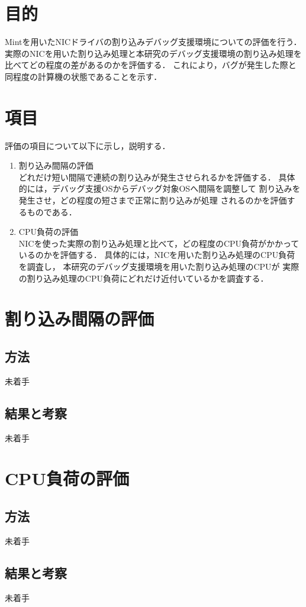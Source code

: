 \documentclass[tanilab-enum]{graduate}
\begin{document}
\section{目的}
Mintを用いたNICドライバの割り込みデバッグ支援環境についての評価を行う．
実際のNICを用いた割り込み処理と本研究のデバッグ支援環境の割り込み処理を
比べてどの程度の差があるのかを評価する．
これにより，バグが発生した際と同程度の計算機の状態であることを示す．
\section{項目}
評価の項目について以下に示し，説明する．
\begin{enumerate}
    \item 割り込み間隔の評価\\
        どれだけ短い間隔で連続の割り込みが発生させられるかを評価する．
        具体的には，デバッグ支援OSからデバッグ対象OSへ間隔を調整して
        割り込みを発生させ，どの程度の短さまで正常に割り込みが処理
        されるのかを評価するものである．
    \item CPU負荷の評価\\
        NICを使った実際の割り込み処理と比べて，どの程度のCPU負荷がかかって
        いるのかを評価する．
        具体的には，NICを用いた割り込み処理のCPU負荷を調査し，
        本研究のデバッグ支援環境を用いた割り込み処理のCPUが
        実際の割り込み処理のCPU負荷にどれだけ近付いているかを調査する．
\end{enumerate}
\section{割り込み間隔の評価}
    \subsection{方法}
    未着手
    \subsection{結果と考察}
    未着手
\section{CPU負荷の評価}
    \subsection{方法}
    未着手
    \subsection{結果と考察}
    未着手
\end{document}
